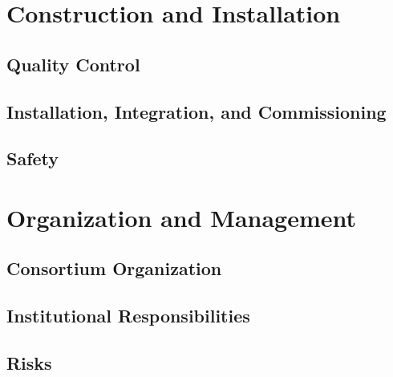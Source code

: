 \section{Construction and Installation}
\label{sec:dp-calib-const}
\subsection{Quality Control}
\label{sec:dp-calib-qc}

\subsection{Installation, Integration, and Commissioning}
\label{sec:dp-calib-iic}

\subsection{Safety}
\label{sec:dp-calib-safe}


\section{Organization and Management}
\label{sec:dp-calib-org-manag}
\subsection{Consortium Organization}
\label{sec:dp-calib-org}

\subsection{Institutional Responsibilities}
\label{sec:dp-calib-resp}

\subsection{Risks}
\label{sec:dp-calib-risks}

%
